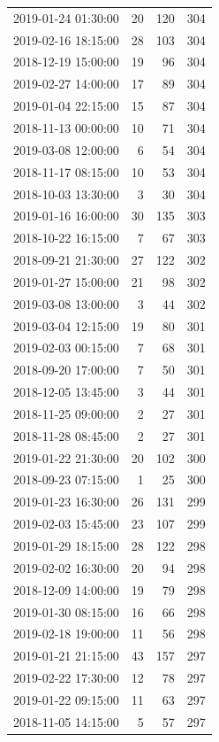 \begin{tabular}{lrrr}
2019-01-24 01:30:00 & 20 & 120 & 304 \\
2019-02-16 18:15:00 & 28 & 103 & 304 \\
2018-12-19 15:00:00 & 19 & 96 & 304 \\
2019-02-27 14:00:00 & 17 & 89 & 304 \\
2019-01-04 22:15:00 & 15 & 87 & 304 \\
2018-11-13 00:00:00 & 10 & 71 & 304 \\
2019-03-08 12:00:00 & 6 & 54 & 304 \\
2018-11-17 08:15:00 & 10 & 53 & 304 \\
2018-10-03 13:30:00 & 3 & 30 & 304 \\
2019-01-16 16:00:00 & 30 & 135 & 303 \\
2018-10-22 16:15:00 & 7 & 67 & 303 \\
2018-09-21 21:30:00 & 27 & 122 & 302 \\
2019-01-27 15:00:00 & 21 & 98 & 302 \\
2019-03-08 13:00:00 & 3 & 44 & 302 \\
2019-03-04 12:15:00 & 19 & 80 & 301 \\
2019-02-03 00:15:00 & 7 & 68 & 301 \\
2018-09-20 17:00:00 & 7 & 50 & 301 \\
2018-12-05 13:45:00 & 3 & 44 & 301 \\
2018-11-25 09:00:00 & 2 & 27 & 301 \\
2018-11-28 08:45:00 & 2 & 27 & 301 \\
2019-01-22 21:30:00 & 20 & 102 & 300 \\
2018-09-23 07:15:00 & 1 & 25 & 300 \\
2019-01-23 16:30:00 & 26 & 131 & 299 \\
2019-02-03 15:45:00 & 23 & 107 & 299 \\
2019-01-29 18:15:00 & 28 & 122 & 298 \\
2019-02-02 16:30:00 & 20 & 94 & 298 \\
2018-12-09 14:00:00 & 19 & 79 & 298 \\
2019-01-30 08:15:00 & 16 & 66 & 298 \\
2019-02-18 19:00:00 & 11 & 56 & 298 \\
2019-01-21 21:15:00 & 43 & 157 & 297 \\
2019-02-22 17:30:00 & 12 & 78 & 297 \\
2019-01-22 09:15:00 & 11 & 63 & 297 \\
2018-11-05 14:15:00 & 5 & 57 & 297 \\

\end{tabular}
